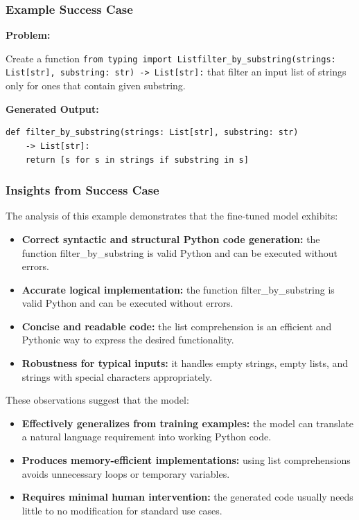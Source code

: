 \subsubsection{Example Success Case}

\textbf{Problem:}

Create a function \texttt{from typing import List\n\n\ndef filter\_by\_substring(strings: List[str], substring: str) -> List[str]:}
that filter an input list of strings only for ones that contain given substring.

\textbf{Generated Output:}
\begin{verbatim}
def filter_by_substring(strings: List[str], substring: str)
    -> List[str]:
    return [s for s in strings if substring in s]
\end{verbatim}

\subsubsection{Insights from Success Case}

The analysis of this example demonstrates that the fine-tuned model exhibits:

\begin{itemize}
\item \textbf{Correct syntactic and structural Python code generation: }the function filter\_by\_substring is valid Python and can be executed without errors.
\item \textbf{Accurate logical implementation: }the function filter\_by\_substring is valid Python and can be executed without errors.
\item \textbf{Concise and readable code: }the list comprehension is an efficient and Pythonic way to express the desired functionality.
\item \textbf{Robustness for typical inputs: }it handles empty strings, empty lists, and strings with special characters appropriately.
\end{itemize}

These observations suggest that the model:

\begin{itemize}
\item \textbf{Effectively generalizes from training examples: }the model can translate a natural language requirement into working Python code.
\item \textbf{Produces memory-efficient implementations: }using list comprehensions avoids unnecessary loops or temporary variables.
\item \textbf{Requires minimal human intervention: }the generated code usually needs little to no modification for standard use cases.
\end{itemize}

